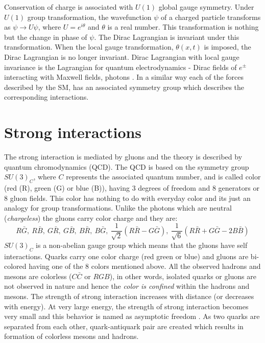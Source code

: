 Conservation of charge is associated with $U(1)$ global gauge symmetry. Under $U(1)$ group transformation, the wavefunction $\psi$ of a 
charged particle transforms as $\psi \to U\psi$, where $U = e^{i\theta}$ and $\theta$ is a real number. This transformation is nothing but 
the change in phase of $\psi$. The Dirac Lagrangian is invariant under this transformation. When the local gauge transformation, 
$\theta(x,t)$ is imposed, the Dirac Lagrangian is no longer invariant. Dirac Lagrangian with local gauge invariance is the Lagrangian for 
quantum electrodynamics - Dirac fields of $e^\pm$ interacting with Maxwell fields, photons \cite{Griffiths:2008zz}.
In a similar way each of the forces described by the SM, has an associated symmetry group which describes the corresponding interactions.

\section{Strong interactions}
The strong interaction is mediated by gluons and the theory is described by quantum chromodynamics (QCD). The QCD is based on the symmetry 
group $SU(3)_C$, where $C$ represents the associated quantum number, and is called color (red (R), green (G) or blue (B)), having 3 degrees of freedom and 8 generators or 8 gluon 
fields. 
This color has nothing to do with everyday color and its just an analogy for group transformations. Unlike the photons which are neutral
(\textit{chargeless}) the gluons carry color charge and they are:
\begin{equation*}
R\bar{G},\ R\bar{B},\ G\bar{R},\ G\bar{B},\ B\bar{R},\ B\bar{G},\ \frac{1}{\sqrt{2}}(R\bar{R}-G\bar{G}),\ \frac{1}{\sqrt{6}}(R\bar{R}+G\bar{G}-2B\bar{B}) 
\end{equation*}
$SU(3)_C$ is a non-abelian gauge group which means that the gluons have self interactions. Quarks carry one color charge (red green or 
blue) and gluons are bi-colored having one of the 8 colors mentioned above. All the observed hadrons and mesons are colorless ($C\bar{C}$ 
or $RGB$), in other words, isolated quarks or gluons are not observed in nature and hence the \textit{color is confined} within the hadrons and mesons. The strength of strong interaction increases with distance (or decreases 
with energy). At very large energy, the strength of strong interaction becomes very small and this behavior is named as asymptotic freedom 
\cite{PhysRevLett.30.1343}\cite{PhysRevLett.30.1346}. As two quarks are separated from each other, quark-antiquark pair are created which 
results in formation of colorless mesons and hadrons.

